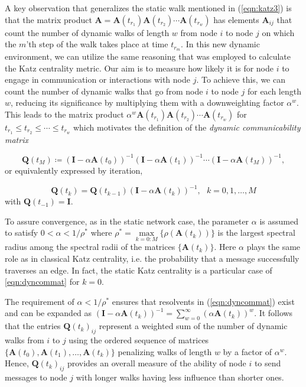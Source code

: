 A key observation that generalizes the static walk mentioned in (\ref{eqn:katz3}) is that the matrix product $\mathbf{A} = \mathbf{A}(t_{r_1})\mathbf{A}(t_{r_2})\cdots \mathbf{A}(t_{r_w})$ has elements $\mathbf{A}_{ij}$ that count the number of dynamic walks of length $w$ from node $i$ to node $j$ on which the $m$'th step of the walk takes place at time $t_{r_m}$. In this new dynamic environment, we can utilize the same reasoning that was employed to calculate the Katz centrality metric. Our aim is to measure how likely it is for node $i$ to engage in communication or interactions with node $j$. To achieve this, we can count the number of dynamic walks that go from node $i$ to node $j$ for each length $w$, reducing its significance by multiplying them with a downweighting factor $\alpha^w$. This leads to the matrix product $\alpha^w\mathbf{A}(t_{r_1})\mathbf{A}(t_{r_2})\cdots \mathbf{A}(t_{r_w})$ for $t_{r_1}\le t_{r_2}\le \cdots \le t_{r_w}$ which motivates the definition of the \textit{dynamic communicability matrix}

\begin{equation}
\label{eqn:dyncommat}
    \mathbf{Q}(t_M) \coloneqq (\mathbf{I} - \alpha\mathbf{A}(t_0))^{-1} (\mathbf{I} - \alpha\mathbf{A}(t_1))^{-1} \cdots (\mathbf{I} - \alpha\mathbf{A}(t_M))^{-1},
\end{equation}
or equivalently expressed by iteration,

\begin{equation}
\label{eqn:dyncommatiter}
    \mathbf{Q}(t_k) = \mathbf{Q}(t_{k-1})(\mathbf{I} - \alpha\mathbf{A}(t_k))^{-1} , ~~~k=0,1,\dots,M
\end{equation}
with $\mathbf{Q}(t_{-1})=\mathbf{I}$.

To assure convergence, as in the static network case, the parameter $\alpha$ is assumed to satisfy $0<\alpha<1/\rho^*$ where $\rho^* = \underset{k=0:M}{\max}\{\rho(\mathbf{A}(t_k))\}$ is the largest spectral radius among the spectral radii of the matrices $\{\mathbf{A}(t_k)\}$. Here $\alpha$ plays the same role as in classical Katz centrality, i.e. the probability that a message successfully traverses an edge. In fact, the static Katz centrality is a particular case of \eqref{eqn:dyncommat} for $k=0$.

The requirement of $\alpha < 1/\rho^*$ ensures that resolvents in (\ref{eqn:dyncommat}) exist and can be expanded as $(\mathbf{I} - \alpha\mathbf{A}(t_k))^{-1} = \sum_{w=0}^{\infty} (\alpha \mathbf{A}(t_k))^w$. It follows that the entries $\mathbf{Q}(t_k)_{ij}$ represent a weighted sum of the number of dynamic walks from $i$ to $j$ using the ordered sequence of matrices $\{\mathbf{A}(t_0),\mathbf{A}(t_1),\dots,\mathbf{A}(t_k)\}$ penalizing walks of length $w$ by a factor of $\alpha^w$. Hence, $\mathbf{Q}(t_k)_{ij}$ provides an overall measure of the ability of node $i$ to send messages to node $j$ with longer walks having less influence than shorter ones.

